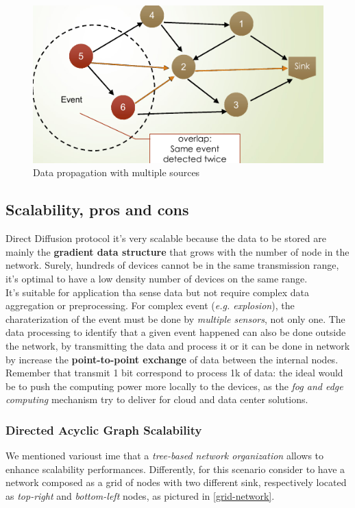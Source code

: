 \documentclass[10pt,a4paper]{report}
\theoremstyle{definition}
\begin{document}
\begin{figure}[h]
	\centering\includegraphics[scale=0.50]{images/Pasted image 20230522175419.png}
	\caption{Data propagation with multiple sources}
\end{figure}

\subsection{Scalability, pros and cons}\label{sec:scalability-pros-and-cons}
Direct Diffusion protocol it's very scalable because the data to be stored are mainly the \textbf{gradient data structure} that grows with the number of node in the network. Surely, hundreds of devices cannot be in the same transmission range, it's optimal to have a low density number of devices on the same range.\\
It's suitable for application tha sense data but not require complex data aggregation or preprocessing. For complex event (\textit{e.g. explosion}), the charaterization of the event must be done by \textit{multiple sensors}, not only one.
The data processing to identify that a given event happened can also be done outside the network, by transmitting the data and process it or it can be done in network by increase the \textbf{point-to-point exchange} of data between the internal nodes.
Remember that transmit 1 bit correspond to process 1k of data: the ideal would be to push the computing power more locally to the devices, as the \textit{fog and edge computing} mechanism try to deliver for cloud and data center solutions.
\subsubsection{Directed Acyclic Graph Scalability}\label{sec:directed-acyclic-graph-scalability}
We mentioned varioust ime that a \textit{tree-based network organization} allows to enhance scalability performances.
Differently, for this scenario consider to have a network composed as a grid of nodes with two different sink, respectively located as \textit{top-right} and \textit{bottom-left} nodes, as pictured in \ref{grid-network}.
\end{document}
